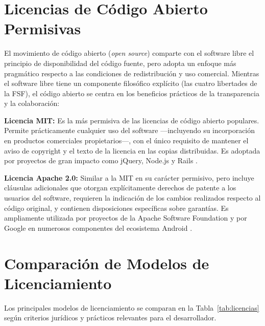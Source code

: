 \documentclass[11pt,a4paper]{report}
\begin{document}
\section{Licencias de Código Abierto Permisivas}

El movimiento de código abierto (\textit{open source}) comparte con el software libre el principio de disponibilidad del código fuente, pero adopta un enfoque más pragmático respecto a las condiciones de redistribución y uso comercial. Mientras el software libre tiene un componente filosófico explícito (las cuatro libertades de la FSF), el código abierto se centra en los beneficios prácticos de la transparencia y la colaboración:

\textbf{Licencia MIT:} Es la más permisiva de las licencias de código abierto populares. Permite prácticamente cualquier uso del software —incluyendo su incorporación en productos comerciales propietarios—, con el único requisito de mantener el aviso de copyright y el texto de la licencia en las copias distribuidas. Es adoptada por proyectos de gran impacto como jQuery, Node.js y Rails \citep{euipo2022}.

\textbf{Licencia Apache 2.0:} Similar a la MIT en su carácter permisivo, pero incluye cláusulas adicionales que otorgan explícitamente derechos de patente a los usuarios del software, requieren la indicación de los cambios realizados respecto al código original, y contienen disposiciones específicas sobre garantías. Es ampliamente utilizada por proyectos de la Apache Software Foundation y por Google en numerosos componentes del ecosistema Android \citep{ompi2024}.

\section{Comparación de Modelos de Licenciamiento}

Los principales modelos de licenciamiento se comparan en la Tabla~\ref{tab:licencias} según criterios jurídicos y prácticos relevantes para el desarrollador.
\end{document}
